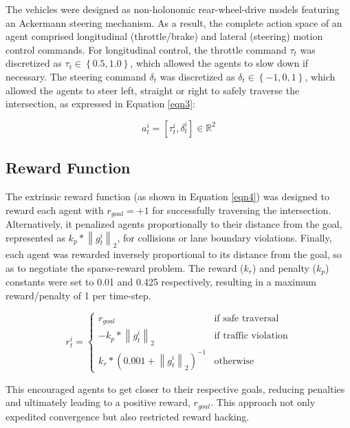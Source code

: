 \documentclass[letterpaper, 10 pt, conference]{ieeeconf}  %
\begin{document}
The vehicles were designed as non-holonomic rear-wheel-drive models featuring an Ackermann steering mechanism. As a result, the complete action space of an agent comprised longitudinal (throttle/brake) and lateral (steering) motion control commands. For longitudinal control, the throttle command $\tau_t$ was discretized as $\tau_t \in \left \{ 0.5, 1.0 \right \}$, which allowed the agents to slow down if necessary. The steering command $\delta_t$ was discretized as $\delta_t \in \left \{ -1, 0, 1 \right \}$, which allowed the agents to steer left, straight or right to safely traverse the intersection, as expressed in Equation \ref{eqn3}:

\begin{equation}
\label{eqn3}
a_t^i = \left [ \tau_t^i, \delta_t^i \right ] \in \mathbb{R}^{2}
\end{equation}

\subsection{Reward Function}
\label{Sub-Section: Reward Function I}

The extrinsic reward function (as shown in Equation \ref{eqn4}) was designed to reward each agent with $r_{goal}=+1$ for successfully traversing the intersection. Alternatively, it penalized agents proportionally to their distance from the goal, represented as $k_p * \left \| g_{t}^{i} \right \|_{2}$, for collisions or lane boundary violations. Finally, each agent was rewarded inversely proportional to its distance from the goal, so as to negotiate the sparse-reward problem. The reward ($k_r$) and penalty ($k_p$) constants were set to 0.01 and 0.425 respectively, resulting in a maximum reward/penalty of 1 per time-step.

\begin{equation}
r_{t}^{i}  =  
\begin{cases}
r_{goal} & \text{if safe traversal} \\
-k_p * \left \| g_{t}^{i} \right \|_{2} & \text{if traffic violation} \\
k_r*(0.001+\left \| g_{t}^{i} \right \|_{2})^{-1} & \text{otherwise}
\end{cases}
\label{eqn4}
\end{equation}

This encouraged agents to get closer to their respective goals, reducing penalties and ultimately leading to a positive reward, $r_{goal}$. This approach not only expedited convergence but also restricted reward hacking.
\end{document}
